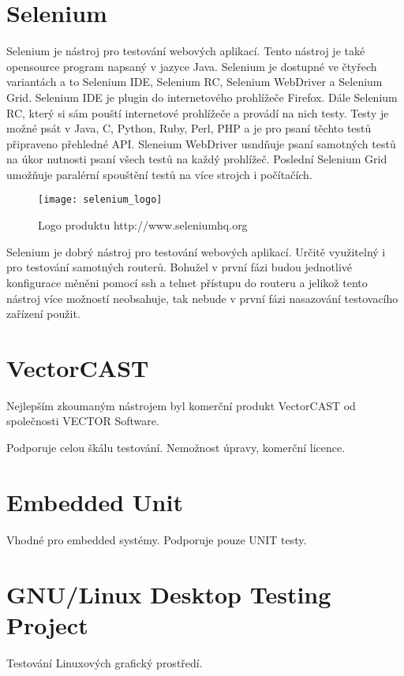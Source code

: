 \section{Selenium}
Selenium je nástroj pro testování webových aplikací. Tento nástroj je také opensource program napsaný v jazyce Java. Selenium je dostupné ve čtyřech variantách a to Selenium IDE, Selenium RC, Selenium WebDriver a Selenium Grid. Selenium IDE je plugin do internetového prohlížeče Firefox. Dále Selenium RC, který si sám pouští internetové prohlížeče a provádí na nich testy. Testy je možné psát v Java, C, Python, Ruby, Perl, PHP a je pro psaní těchto testů připraveno přehledné API. Sleneium WebDriver usndňuje psaní samotných testů na úkor nutnosti psaní všech testů na každý prohlížeč. Poslední Selenium Grid umožňuje paralérní spouštění testů na více strojch i počítačích.

\begin{figure}[h]
  \centering
  \texttt{[image: selenium\_logo]}
  \caption{Logo produktu http://www.seleniumhq.org}
  \label{fig:selenium_logo}
\end{figure}

Selenium je dobrý nástroj pro testování webových aplikací. Určitě využitelný i pro testování samotných routerů. Bohužel v první fázi budou jednotlivé konfigurace měněni pomocí ssh a telnet přístupu do routeru a jelikož tento nástroj více možností neobsahuje, tak nebude v první fázi nasazování testovacího zařízení použit.

\section{VectorCAST}
Nejlepším zkoumaným nástrojem byl komerční produkt VectorCAST od společnosti VECTOR Software.



Podporuje celou škálu testování.
Nemožnost úpravy, komerční licence.



\section{Embedded Unit}
Vhodné pro embedded systémy.
Podporuje pouze UNIT testy.



\section{GNU/Linux Desktop Testing Project}
Testování Linuxových grafický prostředí.

